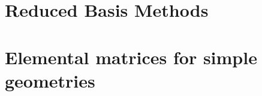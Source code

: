 \documentclass[a4paper,12pt]{report}
\begin{document}

\chapter{Reduced Basis Methods} %
 \label{chapt:rbm} %

 \label{chapt:porous} %

 \label{chapt:adjoint} %



\appendix %

\chapter{Elemental matrices for simple geometries}\label{app:mm}  %
\end{document}
